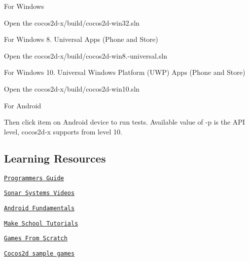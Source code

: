 \begin{DoxyItemize}
\item For Windows
\end{DoxyItemize}

Open the {\ttfamily cocos2d-\/x/build/cocos2d-\/win32.\+sln}


\begin{DoxyItemize}
\item For Windows 8. Universal Apps (Phone and Store)
\end{DoxyItemize}

Open the {\ttfamily cocos2d-\/x/build/cocos2d-\/win8.-\/universal.\+sln}


\begin{DoxyItemize}
\item For Windows 10. Universal Windows Platform (U\+WP) Apps (Phone and Store)
\end{DoxyItemize}

Open the {\ttfamily cocos2d-\/x/build/cocos2d-\/win10.\+sln}


\begin{DoxyItemize}
\item For Android
\end{DoxyItemize}




Then click item on Android device to run tests. Available value of {\ttfamily -\/p} is the A\+PI level, cocos2d-\/x supports from level 10.

\subsection*{Learning Resources }


\begin{DoxyItemize}
\item \href{http://cocos2d-x.org/docs/programmers-guide/2/index.html}{\tt Programmers Guide}
\item \href{https://www.youtube.com/user/sonarsystemslimited/search?query=cocos2d-x}{\tt Sonar Systems Videos}
\item \href{https://developer.android.com/guide/components/fundamentals.html}{\tt Android Fundamentals}
\item \href{https://www.makeschool.com/tutorials/}{\tt Make School Tutorials}
\item \href{http://www.gamefromscratch.com/page/Cocos2d-x-CPP-Game-Programming-Tutorial-Series.aspx}{\tt Games From Scratch}
\item \href{https://github.com/cocos2d/cocos2d-x-samples}{\tt Cocos2d sample games}
\end{DoxyItemize}

